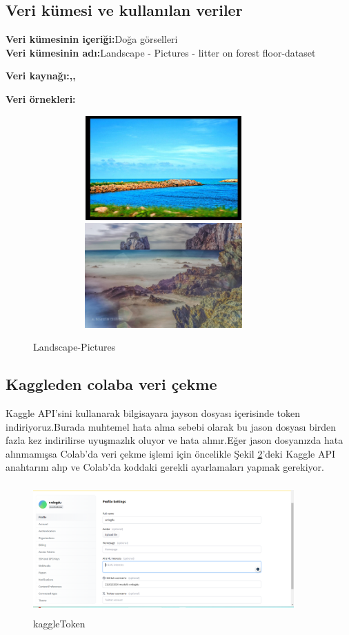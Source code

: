 \documentclass[12pt, a4paper]{article}
\begin{document}
	\subsection{Veri kümesi ve kullanılan veriler }
	{\textbf{Veri kümesinin içeriği:}Doğa görselleri}\\
	{\textbf{Veri kümesinin adı:}Landscape - Pictures - litter on forest floor-dataset}\\
	{\textbf{Veri kaynağı:\cite{Landscape-Pictures},\cite{litter-on-forest-floor},\cite{weather-dataset}}\\
		{\textbf{Veri örnekleri:}\\
			
			\begin{figure}[h]
				\centering
				\includegraphics[width=10cm,height=4cm]{00000000_(5).jpg}\\ 	
				\includegraphics[width=10cm,height=4cm]{00000024_(2).jpg}
				\caption{Landscape-Pictures\cite{Landscape-Pictures}}
				\label{veri}
			\end{figure}
			\subsection{Kaggleden colaba veri çekme}
			Kaggle API'sini kullanarak bilgisayara jayson dosyası içerisinde token indiriyoruz.Burada muhtemel hata alma sebebi olarak bu jason dosyası birden fazla kez indirilirse uyuşmazlık oluyor ve hata alınır.Eğer jason dosyanızda hata alınmamışsa Colab'da veri çekme işlemi için öncelikle Şekil \ref{kaggleToken}'deki Kaggle API anahtarını alıp ve Colab'da koddaki gerekli ayarlamaları yapmak gerekiyor.
			
			\begin{figure}
				\centering
				\includegraphics[width=10cm,height=5cm]{huggingFaceToken.png}
				\caption{kaggleToken}
				\label{kaggleToken}
			\end{figure}
			
}}
\end{document}
